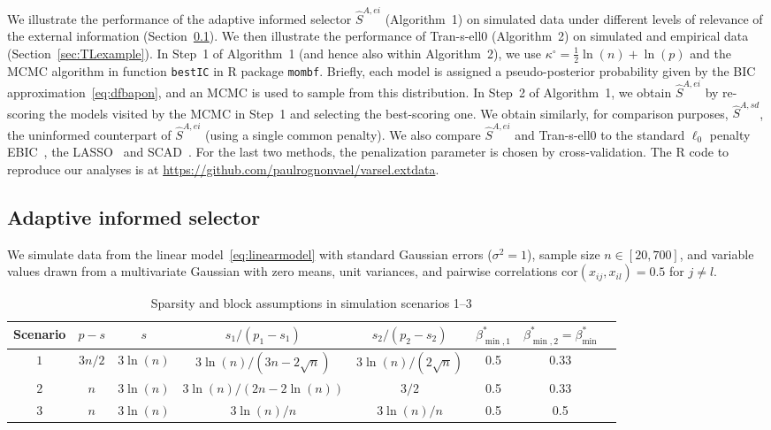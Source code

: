 \documentclass[
  12pt]{article}
\begin{document}
We illustrate the performance of the adaptive informed selector $\hat{S}^{A,ei}$ (Algorithm~1) on simulated data under different levels of relevance of the external information (Section~\ref{sec:simulationsss}).
We then illustrate the performance of Tran-s-ell0 (Algorithm~2) on simulated and empirical data (Section~\ref{sec:TLexample}).
In Step~1 of Algorithm~1 (and hence also within Algorithm~2), we use $\kappa^{\circ}=\tfrac12\ln(n)+\ln(p)$ and
the MCMC algorithm in function \texttt{bestIC} in R package \texttt{mombf}. Briefly, each model is assigned a
pseudo-posterior probability given by the BIC approximation~\eqref{eq:dfbapon}, and an MCMC is used to sample from this distribution. 
In Step~2 of Algorithm~1, we obtain $\hat S^{A,ei}$ by re-scoring the models visited by the MCMC in Step~1 and selecting the best-scoring one. We obtain similarly, for comparison purposes, $\hat S^{A,sd}$, the uninformed counterpart of $\hat{S}^{A,ei}$ (using a single common penalty). We also compare $\hat S^{A,ei}$ and Tran-s-ell0 to the standard $\ell_0$ penalty EBIC~\citep{EBIC}, the LASSO~\citep{lasso} and SCAD~\citep{Fan01SCAD}. For the last two methods, the penalization parameter is chosen by cross-validation. The R code to reproduce our analyses is at 
\url{https://github.com/paulrognonvael/varsel.extdata}.


\subsection{Adaptive informed selector}\label{sec:simulationsss}

We simulate data from the linear model~\eqref{eq:linearmodel} with standard Gaussian errors ($\sigma^2=1$), sample size $n \in [20,700]$, and variable values drawn from a multivariate Gaussian with zero means, unit variances, and pairwise correlations $\mbox{cor}(x_{ij}, x_{il})= 0.5$ for $j \neq l$.

\begin{table}[ht]
\caption{Sparsity and block assumptions in simulation scenarios 1--3}
\label{tab:examples_bis}
\begin{center}
\begin{tabular}[]{@{}cccccccc@{}}
\hline
Scenario & $p-s$ & $s$ & $s_1/(p_1-s_1)$ &$s_2/(p_2-s_2)$ & $\beta_{\min,1}^*$ & $\beta_{\min,2}^*=\beta_{\min}^*$ \\
\hline
$1$    & $3n/2$ & $3\ln(n)$ & $3\ln(n)/(3n-2\sqrt{n})$ & $3\ln(n)/(2\sqrt{n})$  & 0.5 & 0.33\\
$2$    & $n$ & $3\ln(n)$ & $3\ln(n)/(2n-2\ln(n))$ & $3/2$   & 0.5 & 0.33 \\
$3$    & $n$ & $3\ln(n)$ & $3\ln(n)/n$ & $3\ln(n)/n$  & 0.5 & 0.5\\
\hline
\end{tabular}
\end{center}
\end{table}
\end{document}
